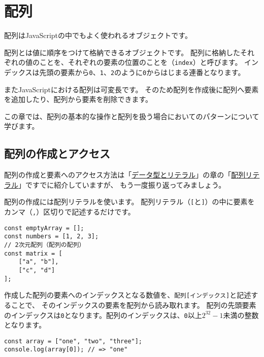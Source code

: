 \hypertarget{array}{%
\chapter{配列}\label{array}}
\thispagestyle{frontheadings}

配列はJavaScriptの中でもよく使われるオブジェクトです。

配列とは値に順序をつけて格納できるオブジェクトです。
配列に格納したそれぞれの値のことを\textbf{}、それぞれの要素の位置のことを\textbf{}（\texttt{index}）と呼びます。
インデックスは先頭の要素から\texttt{0}、\texttt{1}、\texttt{2}のように\texttt{0}からはじまる連番となります。

またJavaScriptにおける配列は可変長です。
そのため配列を作成後に配列へ要素を追加したり、配列から要素を削除できます。

この章では、配列の基本的な操作と配列を扱う場合においてのパターンについて学びます。

\hypertarget{create-and-access}{%
\section{配列の作成とアクセス}\label{create-and-access}}

配列の作成と要素へのアクセス方法は「\hyperlink{data-type-and-literal}{データ型とリテラル}」の章の「\hyperlink{array-literal}{配列リテラル}」ですでに紹介していますが、
もう一度振り返ってみましょう。

配列の作成には配列リテラルを使います。
配列リテラル（\texttt{[}と\texttt{]}）の中に要素をカンマ（\texttt{,}）区切りで記述するだけです。

\begin{lstlisting}
const emptyArray = [];
const numbers = [1, 2, 3];
// 2次元配列（配列の配列）
const matrix = [
    ["a", "b"],
    ["c", "d"]
];
\end{lstlisting}

作成した配列の要素へのインデックスとなる数値を、\texttt{配列[インデックス]}と記述することで、
そのインデックスの要素を配列から読み取れます。
配列の先頭要素のインデックスは\texttt{0}となります。配列のインデックスは、\texttt{0}以上\texttt{$2^{32} - 1$}未満の整数となります。

\begin{lstlisting}
const array = ["one", "two", "three"];
console.log(array[0]); // => "one"
\end{lstlisting}

